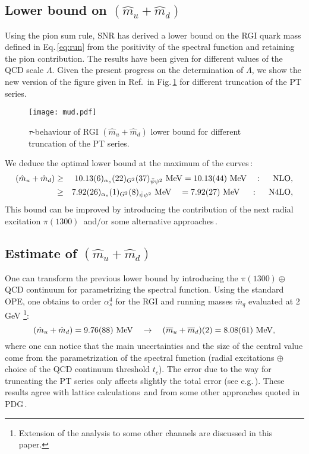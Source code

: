 \documentclass[aps,prd,groupedaddress,nofootinbib]{revtex4-1}
\def\beq{\begin{equation}}
\def\eeq{\end{equation}}
\def\bea{\begin{eqnarray}}
\def\eea{\end{eqnarray}}
\def\nnb{\nonumber}
\def\nnb{\nonumber}
\begin{document}
\subsection{Lower bound on $(\hat{m}_u +\hat{m}_d)$}
Using the pion sum rule, SNR has derived a lower bound on the RGI quark mass defined in Eq.\,\ref{eq:run} from the positivity of the spectral function and retaining the pion contribution.  The results have been given for different values of the QCD scale $\Lambda$. Given the present progress on the determination of $\Lambda$, we show the new version of the figure given in Ref.\,\cite{SNR} in  Fig.\,\ref{fig:mud} for different truncation of the PT series. 
\begin{figure}[hbt]
\begin{center}
\texttt{[image: mud.pdf]}
\caption{\normalsize  $\tau$-behaviour of RGI $(\hat{m}_u +\hat{m}_d)$ lower bound for different truncation of the PT series.}\label{fig:mud}
\end{center}
\vspace*{-0.5cm}
\end{figure} 
We deduce the optimal lower bound at the maximum of the curves\,:
\bea
(\hat{m}_u +\hat{m}_d) &\geq& 10.13(6)_{\alpha_s}(22)_{G^2} (37)_{\bar\psi\psi^2}~{\rm MeV} = 10.13(44)~{\rm MeV}~~~:~~~~{\rm NLO},\nnb\\
&\geq& 7.92(26)_{\alpha_s}(1)_{G^2} (8)_{\bar\psi\psi^2} ~{\rm MeV}~~~= 7.92(27)~{\rm MeV}~~~~:~~~~{\rm N4LO},
\eea
This bound can be improved by introducing the contribution of the next radial excitation $\pi(1300)$\,\cite{SNLIGHT} and/or some alternative approaches\,\cite{LELLOUCH}.

\subsection{Estimate of $(\hat{m}_u +\hat{m}_d)$}
One can transform the previous lower bound by introducing the $\pi(1300)\oplus$ QCD continuum for parametrizing the spectral function. Using the standard OPE, one obtains to order $\alpha_s^4$ for the RGI and running masses $\overline{m}_q$ evaluated at 2 GeV\,\cite{SNLIGHT}\,\footnote{Extension of the analysis to some other channels are discussed in this paper.}:
\beq
(\hat{m}_u +\hat{m}_d) =9.76(88)~{\rm MeV}~~~\to~~~(\overline{m}_u +\overline{m}_d) (2)=8.08(61)~{\rm MeV},
\eeq
where one can notice that the main uncertainties and the size of the central value come from the parametrization of the spectral function (radial excitations $\oplus$ choice of the QCD continuum threshold $t_c$). The error due to the way for truncating  the PT series only affects slightly  the total error (see e.g.\,\cite{KAHN}). 
These results agree with lattice calculations\,\cite{LATTLIGHT} and from some other approaches quoted in PDG\,\cite{PDG}.
\end{document}
